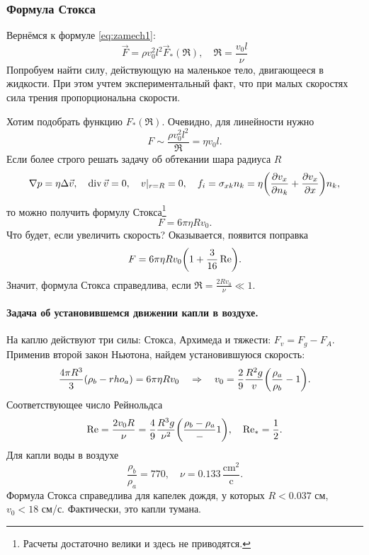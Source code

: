 \subsubsection{Формула Стокса}
Вернёмся к формуле \eqref{eq:zamech1}:
\begin{equation}
     \vec{F} = \rho v_0^2 l^2 \vec{F}_* (\Re), \quad \Re=\frac{v_0 l}{\nu}
\end{equation}
Попробуем найти силу, действующую на маленькое тело, двигающееся в жидкости. При этом учтем экспериментальный факт, что при малых скоростях сила трения пропорциональна скорости. 

Хотим подобрать функцию $F_*(\Re)$. Очевидно, для линейности нужно
\begin{equation}
    F\sim \frac{\rho v_0^2 l^2}{\Re}=\eta v_0 l.
\end{equation}
Если более строго решать задачу об обтекании шара радиуса $R$
\begin{equation}
    \nabla p = \eta \Delta \vec{v}, \quad
    \operatorname{div} \vec{v} = 0, \quad v|_{r=R}=0, \quad
    f_i=\sigma_{xk} n_k = \eta \qty(\pdv{v_x}{n_k}+\pdv{v_x}{x})n_k,
\end{equation}
то можно получить формулу Стокса\footnote{Расчеты достаточно велики и здесь не приводятся.}
\begin{equation}
    F=6\pi \eta R v_0.
\end{equation}
Что будет, если увеличить скорость? Оказывается, появится поправка
\begin{equation}
    F=6\pi \eta R v_0 \qty(1+\frac{3}{16}\Re).
\end{equation}
Значит, формула Стокса справедлива, если $\Re=\frac{2Rv_0}{\nu} \ll 1$.

\paragraph{Задача об установившемся движении капли в воздухе. } На каплю действуют три силы: Стокса, Архимеда и тяжести: $F_v=F_g-F_A$. Применив второй закон Ньютона, найдем установившуюся скорость:
\begin{equation}
	\frac{4\pi R^3}{3}\qty(\rho_b-rho_a) = 6\pi \eta R v_0 \quad \Rightarrow \quad
	v_0 = \frac{2}{9} \frac{R^2 g}{v}\qty(\frac{\rho_a}{\rho_b}-1).
\end{equation}
Соответствующее число Рейнольдса
\begin{equation}
	\Re = \frac{2v_0 R}{\nu} = \frac49 \frac{R^3 g}{\nu^2}\qty(\frac{\rho_b-\rho_a}-1), \quad \Re_*=\frac{1}{2}.
\end{equation}
Для капли воды в воздухе 
\begin{equation}
	\frac{\rho_b}{\rho_a} = 770,\quad \nu=0.133 \,\frac{\text{cm}^2}{\text{c}}.
\end{equation}
Формула Стокса справедлива для капелек дождя, у которых $R<0.037$ см, $v_0 < 18 $ см/с. Фактически, это капли тумана.


